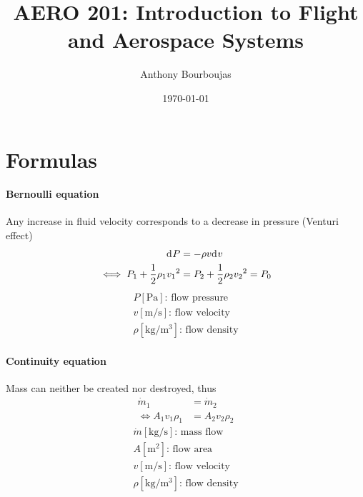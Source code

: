 \documentclass[10pt, twocolumn]{article}
\title{AERO 201: Introduction to Flight and Aerospace Systems}
\date{\today}
\author{Anthony Bourboujas}
\begin{document}
\maketitle %

\section{Formulas}
\paragraph{Bernoulli equation}
Any increase in fluid velocity corresponds to a decrease in pressure (Venturi effect)
\begin{align*}
  \mathrm{d}^{} P                            & = - \rho v \mathrm{d}^{} v                    \\
  \iff P_1 + \frac{1}{2} \rho_1 {v_1}^2 & = P_2 + \frac{1}{2} \rho_2 {v_2}^2 = P_0
\end{align*}
\[
  \begin{array}{|l}
    P [\si{\pascal}] \text{: flow pressure}           \\
    v [\si{\metre\per\second}] \text{: flow velocity} \\
    \rho [\si{\kilogram\per\metre\cubed}] \text{: flow density}
  \end{array}
\]

\paragraph{Continuity equation}
Mass can neither be created nor destroyed, thus
\begin{align*}
  \dot{m}_1           & = \dot{m}_2      \\
  \iff A_1 v_1 \rho_1 & = A_2 v_2 \rho_2
\end{align*}
\[
  \begin{array}{|l}
    \dot{m} [\si{\kilogram\per\second}] \text{: mass flow} \\
    A [\si{\metre\squared}] \text{: flow area}             \\
    v [\si{\metre\per\second}] \text{: flow velocity}      \\
    \rho [\si{\kilogram\per\metre\cubed}] \text{: flow density}
  \end{array}
\]
\end{document}
